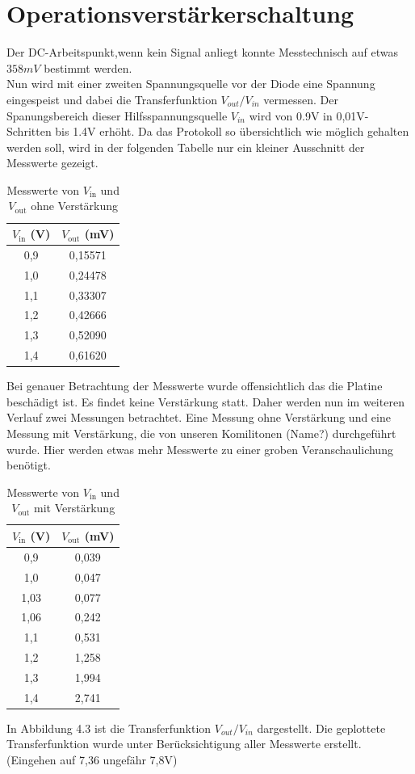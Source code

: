 \section{Operationsverstärkerschaltung} %
Der DC-Arbeitspunkt,wenn kein Signal anliegt konnte Messtechnisch auf etwas $358mV$ bestimmt werden.
\\
Nun wird mit einer zweiten Spannungsquelle vor der Diode eine Spannung eingespeist und dabei die Transferfunktion
$V_{out}/V_ {in}$ vermessen. Der Spanungsbereich dieser Hilfsspannungsquelle $V_{in}$ wird von 0.9V in 0,01V-Schritten bis 1.4V erhöht.
Da das Protokoll so übersichtlich wie möglich gehalten werden soll, wird in der folgenden Tabelle nur ein kleiner Ausschnitt der
Messwerte gezeigt.
\begin{table}[h]
\centering
\begin{tabular}{|c|c|}
\hline
$V_{\text{in}}$ (V) & $V_{\text{out}}$ (mV) \\
\hline
0{,}9 & 0{,}15571 \\
1{,}0 & 0{,}24478 \\
1{,}1 & 0{,}33307 \\
1{,}2 & 0{,}42666 \\
1{,}3 & 0{,}52090 \\
1{,}4 & 0{,}61620 \\
\hline
\end{tabular}
\caption{Messwerte von $V_{\text{in}}$ und $V_{\text{out}}$ ohne Verstärkung}
\end{table}
\clearpage
Bei genauer Betrachtung der Messwerte wurde offensichtlich das die Platine beschädigt ist. Es findet keine Verstärkung
statt. Daher werden nun im weiteren Verlauf zwei Messungen betrachtet. Eine Messung ohne Verstärkung und eine Messung mit Verstärkung, die von 
unseren Komilitonen (Name?) durchgeführt wurde. Hier werden etwas mehr Messwerte zu einer groben Veranschaulichung benötigt. \\

\begin{table}[h]
\centering
\begin{tabular}{|c|c|}
\hline
$V_{\text{in}}$ (V) & $V_{\text{out}}$ (mV) \\
\hline
0{,}9 & 0{,}039 \\
1{,}0 & 0{,}047\\
1{,}03 & 0{,}077 \\
1{,}06 & 0{,}242 \\
1{,}1 & 0{,}531 \\
1{,}2 & 1{,}258 \\
1{,}3 & 1{,}994 \\
1{,}4 & 2{,}741 \\
\hline
\end{tabular}
\caption{Messwerte von $V_{\text{in}}$ und $V_{\text{out}}$ mit Verstärkung}
\end{table}
In Abbildung 4.3 ist die Transferfunktion $V_{out}/V_ {in}$ dargestellt. Die geplottete Transferfunktion wurde
unter Berücksichtigung aller Messwerte erstellt.\\
(Eingehen auf 7,36 ungefähr 7,8V)





